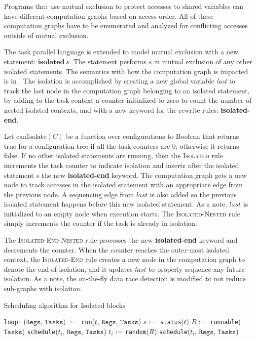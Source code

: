 Programs that use mutual exclusion to protect accesses to shared variables can have different computation graphs based on access order. All of these computation graphs have to be enumerated and analyzed for conflicting accesses outside of mutual exclusion.

The task parallel language is extended to model mutual exclusion with a new statement: $\textbf{isolated}~s$.
The statement performs $s$ in mutual exclusion of any other isolated statements. The semantics with how the computation graph is impacted is in . The isolation is accomplished by creating a new global variable \textit{last} to track the last node in the computation graph belonging to an isolated statement, by adding to the task context a counter initialized to zero to count the number of nested isolated contexts, and with a new keyword for the rewrite rules: \textbf{isolated-end}. 

Let $\mathrm{canIsolate}(C)$ be a function over configurations to Boolean that returns true for a configuration tree if all the task counters are 0; otherwise it returns false. If no other isolated statements are running, then the \textsc{Isolated} rule increments the task counter to indicate isolation and inserts after the isolated statement $\mathit{s}$ the new \textbf{isolated-end} keyword. The computation graph gets a new node to track accesses in the isolated statement with an appropriate edge from the previous node. A sequencing edge from $\mathit{last}$ is also added so the previous isolated statement happens before this new isolated statement. As a note, $\mathit{last}$ is initialized to an empty node when execution starts. The \textsc{Isolated-Nested} rule simply increments the counter if the task is already in isolation.

The \textsc{Isolated-End-Nested} rule processes the new \textbf{isolated-end} keyword and decrements the counter. When the counter reaches the outer-most isolated context, the \textsc{Isolated-End} rule creates a new node in the computation graph to denote the end of isolation, and it updates $\mathit{last}$ to properly sequence any future isolation. As a note, the on-the-fly data race detection is modified to not reduce sub-graphs with isolation.

\begin{algorithm}
\caption{Scheduling algorithm for Isolated blocks} \label{algo:isolated}
\begin{algorithmic}[1]
  \State \texttt{loop}:\ ($\mathtt{Regs}$, $\mathtt{Tasks}$) $:=$ \texttt{run}($t$, $\mathtt{Regs}$, $\mathtt{Tasks}$)\label{loc:run}
  \State $s :=$ \texttt{status}($t$)
  \State $R :=$ \texttt{runnable}($\mathtt{Tasks}$)
  \label{loc:entry:isolated}
  \label{loc:prsched}
  \State \texttt{schedule}($t_i$, $\mathtt{Regs}$, $\mathtt{Tasks}$)
  \EndFor
  \Else
  \State $t_i$ := \texttt{random}($R$)\label{loc:rand}
  \State \texttt{schedule}($t_i$, $\mathtt{Regs}$, $\mathtt{Tasks}$)
  \EndIf
  \EndFunction
\end{algorithmic}
\end{algorithm}

